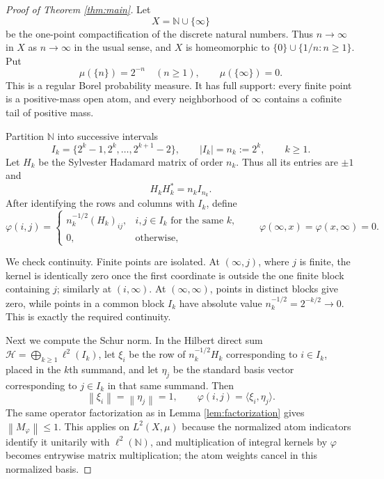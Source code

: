\documentclass[11pt]{article}
\newcommand{\N}{\mathbb N}
\newcommand{\norm}[1]{\left\lVert #1\right\rVert}
\begin{document}
\begin{proof}[Proof of Theorem \ref{thm:main}]
Let
\[
                         X=\N\cup\{\infty\}
\]
be the one-point compactification of the discrete natural numbers.  Thus
$n\to\infty$ in $X$ as $n\to\infty$ in the usual sense, and $X$ is
homeomorphic to $\{0\}\cup\{1/n:n\geq1\}$.  Put
\[
          \mu(\{n\})=2^{-n}\quad(n\geq1),
          \qquad \mu(\{\infty\})=0.
\]
This is a regular Borel probability measure.  It has full support: every
finite point is a positive-mass open atom, and every neighborhood of
$\infty$ contains a cofinite tail of positive mass.

Partition $\N$ into successive intervals
\[
              I_k=\{2^k-1,2^k,\ldots,2^{k+1}-2\},
              \qquad |I_k|=n_k:=2^k,
              \qquad k\geq1.
\]
Let $H_k$ be the Sylvester Hadamard matrix of order $n_k$.  Thus all its
entries are $\pm1$ and
\[
                         H_kH_k^*=n_kI_{n_k}.
\]
After identifying the rows and columns with $I_k$, define
\begin{equation}\label{eq:kernel}
 \varphi(i,j)=
 \begin{cases}
  n_k^{-1/2}(H_k)_{ij},&i,j\in I_k\text{ for the same }k,\\
  0,&\text{otherwise},
 \end{cases}
 \qquad
 \varphi(\infty,x)=\varphi(x,\infty)=0.
\end{equation}

We check continuity.  Finite points are isolated.  At $(\infty,j)$, where
$j$ is finite, the kernel is identically zero once the first coordinate is
outside the one finite block containing $j$; similarly at $(i,\infty)$.  At
$(\infty,\infty)$, points in distinct blocks give zero, while points in a
common block $I_k$ have absolute value $n_k^{-1/2}=2^{-k/2}\to0$.  This is
exactly the required continuity.

Next we compute the Schur norm.  In the Hilbert direct sum
$\mathcal H=\bigoplus_{k\geq1}\ell^2(I_k)$, let $\xi_i$ be the row of
$n_k^{-1/2}H_k$ corresponding to $i\in I_k$, placed in the $k$th summand,
and let $\eta_j$ be the standard basis vector corresponding to $j\in I_k$
in that same summand.  Then
\[
       \norm{\xi_i}=\norm{\eta_j}=1,
       \qquad \varphi(i,j)=\langle\xi_i,\eta_j\rangle.
\]
The same operator factorization as in Lemma \ref{lem:factorization} gives
$\norm{M_\varphi}\leq1$.  This applies on $L^2(X,\mu)$ because the normalized
atom indicators identify it unitarily with $\ell^2(\N)$, and multiplication
of integral kernels by $\varphi$ becomes entrywise matrix multiplication;
the atom weights cancel in this normalized basis.


\end{proof}
\end{document}
